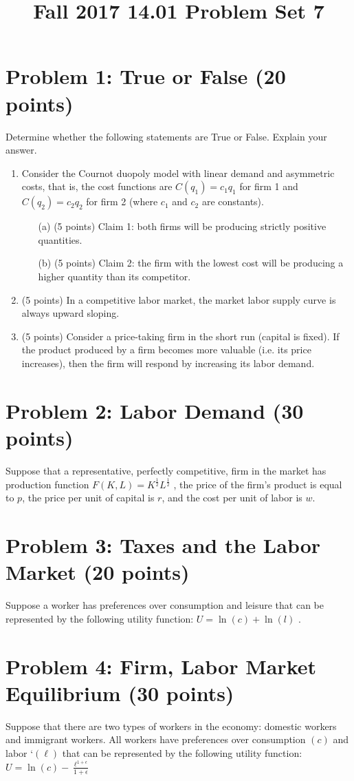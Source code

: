 \documentclass{article}
\begin{document}
\title{Fall 2017 14.01 Problem Set 7}
\maketitle

\section*{Problem 1: True or False (20 points)}
Determine whether the following statements are True or False. Explain your answer.

\begin{enumerate}
\item Consider the Cournot duopoly model with linear demand and asymmetric costs, that is, the cost functions are $C(q_1) = c_1q_1$ for firm 1 and $C(q_2) = c_2q_2$ for firm 2 (where $c_1$ and $c_2$ are constants).
   \begin{enumerate}
   \item[(a)] (5 points) Claim 1: both firms will be producing strictly positive quantities.
   \item[(b)] (5 points) Claim 2: the firm with the lowest cost will be producing a higher quantity than its competitor. 
   \end{enumerate}
   
\item (5 points) In a competitive labor market, the market labor supply curve is always upward sloping.

\item (5 points) Consider a price-taking firm in the short run (capital is fixed). If the product produced by a firm becomes more valuable (i.e. its price increases), then the firm will respond by increasing its labor demand. 
\end{enumerate}

\section*{Problem 2: Labor Demand (30 points)}
Suppose that a representative, perfectly competitive, firm in the market has production function $F(K, L) = K^{\frac{1}{2}}L^{\frac{1}{2}}$ , the price of the firm’s product is equal to $p$, the price per unit of capital is $r$, and the cost per unit of labor is $w$.

\section*{Problem 3: Taxes and the Labor Market (20 points)}
Suppose a worker has preferences over consumption and leisure that can be represented by the following utility function: $U = \ln (c) + \ln (l)$ .

\section*{Problem 4: Firm, Labor Market Equilibrium (30 points)}
Suppose that there are two types of workers in the economy: domestic workers and immigrant workers. All workers have preferences over consumption $(c)$ and labor `$(\ell)$ that can be represented by the following utility function: $U = \ln (c) - \frac{\ell^{1+\epsilon}}{1 + \epsilon}$
\end{document}
